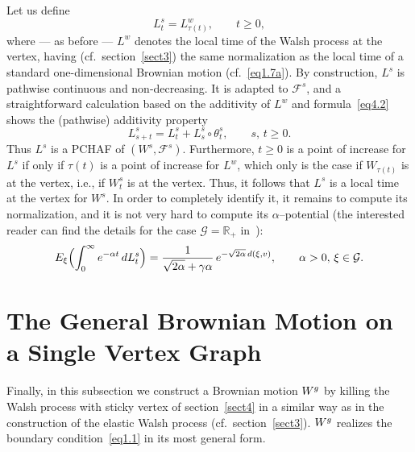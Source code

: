 \documentclass[11pt,a4paper]{amsart}
\newcommand{\ga}{\alpha}
\renewcommand{\gg}{\gamma}
\newcommand{\cF}{\mathcal{F}}
\newcommand{\cG}{\mathcal{G}}
\newcommand{\1}{1}
\newcommand{\R}{\mathbb{R}}
\theoremstyle{remark}
\let\comp\circ
\newcommand{\Wg}{\ensuremath W^g}
\numberwithin{equation}{section}
\begin{document}
Let us define
\begin{equation}    \label{sLT}
    L^s_t = L^w_{\tau(t)},\qquad t\ge 0,
\end{equation}
where --- as before --- $L^w$ denotes the local time of the Walsh process at the
vertex, having (cf.\ section~\ref{sect3}) the same normalization as the local time
of a standard one-dimensional Brownian motion (cf.~\eqref{eq1.7a}). By construction,
$L^s$ is pathwise continuous and non-decreasing. It is adapted to $\cF^s$, and a
straightforward calculation based on the additivity of $L^w$ and
formula~\eqref{eq4.2} shows the (pathwise) additivity property
\begin{equation}    \label{add_sLT}
    L^s_{s+t} = L^s_t + L^s_s \comp \theta^s_t,\qquad s,\,t\ge 0.
\end{equation}
Thus $L^s$ is a PCHAF of $(W^s,\cF^s)$. Furthermore, $t\ge 0$ is a point of increase
for $L^s$ if only if $\tau(t)$ is a point of increase for $L^w$, which only is the
case if $W_{\tau(t)}$ is at the vertex, i.e., if $W^s_t$ is at the vertex. Thus, it
follows that $L^s$ is a local time at the vertex for $W^s$. In order to completely
identify it, it remains to compute its normalization, and it is not very hard to
compute its $\ga$--potential (the interested reader can find the details for the
case $\cG=\R_+$ in~\cite{BMMG0}):
\begin{equation}    \label{norm_sLT}
    E_\xi\Bigl(\int_0^\infty e^{-\ga t}\,dL^s_t\Bigr)
        = \frac{1}{\sqrt{2\ga}+\gg\ga}\,e^{-\sqrt{2\ga}\,d(\xi,v)},\qquad \ga>0,\,\xi\in\cG.
\end{equation}


\section{The General Brownian Motion on a Single Vertex Graph}  \label{sect5}
Finally, in this subsection we construct a Brownian motion $\Wg$ by killing the Walsh
process with sticky vertex of section~\ref{sect4} in a similar way as in the
construction of the elastic Walsh process (cf.~section~\ref{sect3}). $\Wg$ realizes
the boundary condition~\eqref{eq1.1} in its most general form.
\end{document}
